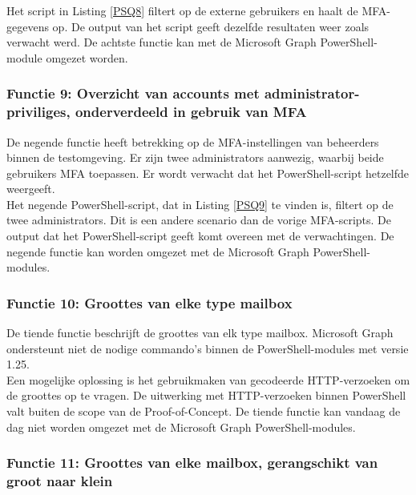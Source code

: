 Het script in Listing \ref{PSQ8} filtert op de externe gebruikers en haalt de \ac{MFA}-gegevens op. De output van het script geeft dezelfde resultaten weer zoals verwacht werd. De achtste functie kan met de Microsoft Graph PowerShell-module omgezet worden.

\subsubsection{Functie 9: Overzicht van accounts met administrator-priviliges, onderverdeeld in gebruik van MFA}


De negende functie heeft betrekking op de \ac{MFA}-instellingen van beheerders binnen de testomgeving. Er zijn twee administrators aanwezig, waarbij beide gebruikers \ac{MFA} toepassen. Er wordt verwacht dat het PowerShell-script hetzelfde weergeeft. \\

Het negende PowerShell-script, dat in Listing \ref{PSQ9} te vinden is, filtert op de twee administrators. Dit is een andere scenario dan de vorige \ac{MFA}-scripts. De output dat het PowerShell-script geeft komt overeen met de verwachtingen. De negende functie kan worden omgezet met de Microsoft Graph PowerShell-modules.

\subsubsection{Functie 10: Groottes van elke type mailbox}


De tiende functie beschrijft de groottes van elk type mailbox. Microsoft Graph ondersteunt niet de nodige commando's binnen de PowerShell-modules met versie 1.25. \\

Een mogelijke oplossing is het gebruikmaken van gecodeerde \ac{HTTP}-verzoeken om de groottes op te vragen. De uitwerking met \ac{HTTP}-verzoeken binnen PowerShell valt buiten de scope van de Proof-of-Concept. De tiende functie kan vandaag de dag niet worden omgezet met de Microsoft Graph PowerShell-modules.

\subsubsection{Functie 11: Groottes van elke mailbox, gerangschikt van groot naar klein}


